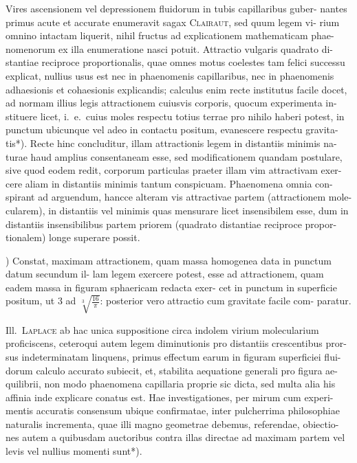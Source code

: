 \documentclass[12pt,a4paper]{article}
\theoremstyle{gauss}
\begin{document}
\vspace{8pt}

Vires ascensionem vel depressionem fluidorum in tubis capillaribus guber-
nantes primus acute et accurate enumeravit sagax \textsc{Clairaut}, sed quum legem vi-
rium omnino intactam liquerit, nihil fructus ad explicationem mathematicam phae-
nomenorum ex illa enumeratione nasci potuit. Attractio vulgaris quadrato di-
stantiae reciproce proportionalis, quae omnes motus coelestes tam felici successu
explicat, nullius usus est nec in phaenomenis capillaribus, nec in phaenomenis
adhaesionis et cohaesionis explicandis; calculus enim recte institutus facile docet,
ad normam illius legis attractionem cuiusvis corporis, quocum experimenta in-
stituere licet, i.~e.~cuius moles respectu totius terrae pro nihilo haberi potest, in
punctum ubicunque vel adeo in contactu positum, evanescere respectu gravita-
tis*). Recte hinc concluditur, illam attractionis legem in distantiis minimis na-
turae haud amplius consentaneam esse, sed modificationem quandam postulare,
sive quod eodem redit, corporum particulas praeter illam vim attractivam exer-
cere aliam in distantiis minimis tantum conspicuam. Phaenomena omnia con-
spirant ad arguendum, hancce alteram vis attractivae partem (attractionem mole-
cularem), in distantiis vel minimis quas mensurare licet insensibilem esse, dum
in distantiis insensibilibus partem priorem (quadrato distantiae reciproce propor-
tionalem) longe superare possit.

\vspace{8pt}
{\footnotesize *) Constat, maximam attractionem, quam massa homogenea data in punctum datum secundum il-
lam legem exercere potest, esse ad attractionem, quam eadem massa in figuram sphaericam redacta exer-
cet in punctum in superficie positum, ut $3$ ad $\sqrt[3]{\frac{16}{\pi}}$: posterior vero attractio cum gravitate facile com-
paratur.}

\newpage
\setcounter{page}{33}

Ill.~\textsc{Laplace} ab hac unica suppositione circa indolem virium molecularium
proficiscens, ceteroqui autem legem diminutionis pro distantiis crescentibus pror-
sus indeterminatam linquens, primus effectum earum in figuram superficiei flui-
dorum calculo accurato subiecit, et, stabilita aequatione generali pro figura ae-
quilibrii, non modo phaenomena capillaria proprie sic dicta, sed multa alia his
affinia inde explicare conatus est. Hae investigationes, per mirum cum experi-
mentis accuratis consensum ubique confirmatae, inter pulcherrima philosophiae
naturalis incrementa, quae illi magno geometrae debemus, referendae, obiectio-
nes autem a quibusdam auctoribus contra illas directae ad maximam partem vel
levis vel nullius momenti sunt*).
\end{document}
